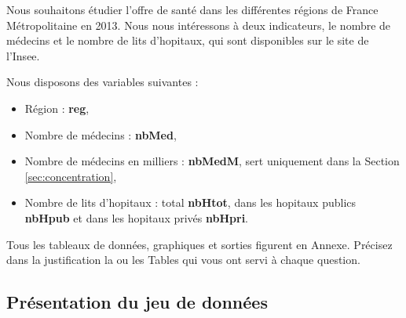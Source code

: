 \documentclass[a4paper,11pt]{article}
\begin{document}
Nous souhaitons étudier l'offre de santé dans les différentes régions de France Métropolitaine en 2013. Nous nous intéressons à deux indicateurs, le nombre de médecins et le nombre de lits d'hopitaux, qui sont disponibles sur le site de l'Insee. 

\medskip
Nous disposons des variables suivantes :
\begin{itemize}
\item Région : \textbf{reg},
\item Nombre de médecins : \textbf{nbMed},
\item Nombre de médecins en milliers : \textbf{nbMedM}, sert uniquement dans la Section \ref{sec:concentration},
\item Nombre de lits d'hopitaux : total \textbf{nbHtot}, dans les hopitaux publics \textbf{nbHpub} et dans les hopitaux privés \textbf{nbHpri}.
\end{itemize}

\medskip
Tous les tableaux de données, graphiques et sorties figurent en Annexe. Précisez dans la justification la ou les Tables qui vous ont servi à chaque question.

\subsection{Présentation du jeu de données}
\end{document}

